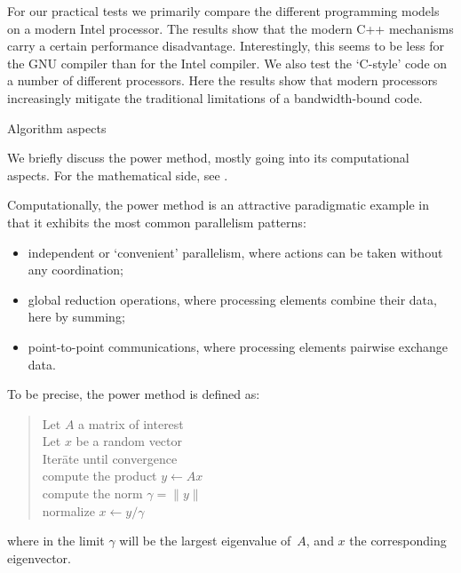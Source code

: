 For our practical tests we primarily compare the different programming models
on a modern Intel processor. The results show that the modern C++
mechanisms carry a certain performance disadvantage.
Interestingly, this seems to be less for the GNU compiler than
for the Intel compiler.
We also test the `C-style' code on a number of different processors.
Here the results show that modern processors increasingly
mitigate the traditional limitations of a bandwidth-bound code.

 {Algorithm aspects}


We briefly discuss the power method, mostly going into
its computational aspects.
For the mathematical side, see .

Computationally, the power method is an attractive paradigmatic example
in that it exhibits the most common parallelism patterns:
\begin{itemize}
\item independent or `convenient' parallelism, where
  actions can be taken without any coordination;
\item global reduction operations, where
  processing elements combine their data, here by summing;
\item point-to-point communications, where
  processing elements pairwise exchange data.
\end{itemize}
To be precise,
the power method is defined as:
\begin{quote}
  \begin{tabbing}
    Let $A$ a matrix of interest\\
    Let $x$ be a random vector\\
    Iter\=ate until convergence\\
    \> compute the product $y\leftarrow Ax$\\
    \> compute the norm $\gamma=\| y \|$\\
    \> normalize $x\leftarrow y/\gamma$\\
  \end{tabbing}
\end{quote}
where in the limit $\gamma$ will be the
largest eigenvalue of~$A$,
and $x$ the corresponding eigenvector.

